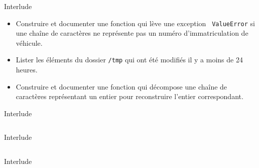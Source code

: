 \documentclass[dvipsnames]{beamer}
\begin{document}
\begin{frame}
    [fragile]{Interlude}

    \begin{itemize}
        \setlength{\itemsep}{0pt}\setlength{\parskip}{1em}
        \item Construire et
              documenter une fonction qui lève une exception \texttt{\small
                  ValueError} si une chaîne de caractères ne représente pas un numéro
              d'immatriculation de véhicule.
        \item Lister les éléments du dossier \texttt{\small /tmp} qui ont été
              modifiés il y a moins de 24 heures.
        \item Construire et documenter une fonction qui décompose une chaîne de
              caractères représentant un entier pour reconstruire l'entier
              correspondant.\\
              \mbox{}\hfill\PointingHand{} \quad\mbox{}
    \end{itemize}
\end{frame}


\begin{frame} [fragile]{Interlude}
    \inputminted[fontsize=\scriptsize]{python3}{code/interlude_02_1.py}
\end{frame}
\begin{frame} [fragile]{Interlude}
    \inputminted[fontsize=\scriptsize]{python3}{code/interlude_02_2.py}
\end{frame}
\begin{frame} [fragile]{Interlude}
    \inputminted[fontsize=\scriptsize]{python3}{code/interlude_02_3.py}
\end{frame}
\end{document}
